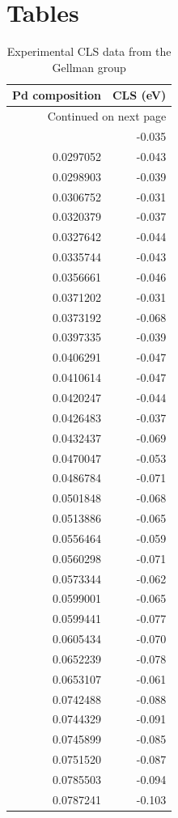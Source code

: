\documentclass[number, sort&compress, review, 12pt]{elsarticle}
\begin{document}
\section{Tables}
\label{sec-11}
\begin{longtable}{rr}
\caption{\label{gellman}Experimental CLS data from the Gellman group}
\\
Pd composition & CLS (eV)\\
\hline
\endhead
\hline\multicolumn{2}{r}{Continued on next page} \\
\endfoot
\endlastfoot
0.0269813 & -0.035\\
0.0297052 & -0.043\\
0.0298903 & -0.039\\
0.0306752 & -0.031\\
0.0320379 & -0.037\\
0.0327642 & -0.044\\
0.0335744 & -0.043\\
0.0356661 & -0.046\\
0.0371202 & -0.031\\
0.0373192 & -0.068\\
0.0397335 & -0.039\\
0.0406291 & -0.047\\
0.0410614 & -0.047\\
0.0420247 & -0.044\\
0.0426483 & -0.037\\
0.0432437 & -0.069\\
0.0470047 & -0.053\\
0.0486784 & -0.071\\
0.0501848 & -0.068\\
0.0513886 & -0.065\\
0.0556464 & -0.059\\
0.0560298 & -0.071\\
0.0573344 & -0.062\\
0.0599001 & -0.065\\
0.0599441 & -0.077\\
0.0605434 & -0.070\\
0.0652239 & -0.078\\
0.0653107 & -0.061\\
0.0742488 & -0.088\\
0.0744329 & -0.091\\
0.0745899 & -0.085\\
0.0751520 & -0.087\\
0.0785503 & -0.094\\
0.0787241 & -0.103\\

\end{longtable}
\end{document}
